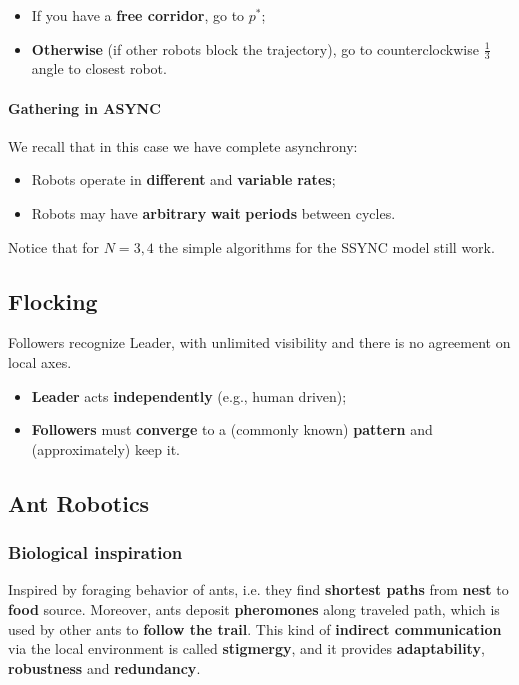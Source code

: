 \begin{itemize}
    \item If you have a \textbf{free corridor}, go to $p^*$;
    \item \textbf{Otherwise} (if other robots block the trajectory), go to counterclockwise $\frac{1}{3}$ angle to closest robot.
\end{itemize}

\paragraph{Gathering in ASYNC}
We recall that in this case we have complete asynchrony:
\begin{itemize}
    \item Robots operate in \textbf{different} and \textbf{variable} \textbf{rates};
    \item Robots may have \textbf{arbitrary} \textbf{wait} \textbf{periods} between cycles.
\end{itemize}
Notice that for $N = 3,4$ the simple algorithms for the SSYNC model still work.

\subsection{Flocking}
Followers recognize Leader, with unlimited visibility and there is no agreement on local axes.
\begin{itemize}
    \item \textbf{Leader} acts \textbf{independently} (e.g., human driven);
    \item \textbf{Followers} must \textbf{converge} to a (commonly known) \textbf{pattern} and (approximately) keep it.
\end{itemize}

\subsection{Ant Robotics}
\subsubsection{Biological inspiration}
Inspired by foraging behavior of ants, i.e. they find \textbf{shortest paths} from \textbf{nest} to \textbf{food} source. Moreover, ants deposit \textbf{pheromones} along traveled path, which is used by other ants to \textbf{follow the trail}. This kind of \textbf{indirect communication} via the local environment is called \textbf{stigmergy}, and it provides \textbf{adaptability}, \textbf{robustness} and \textbf{redundancy}.

